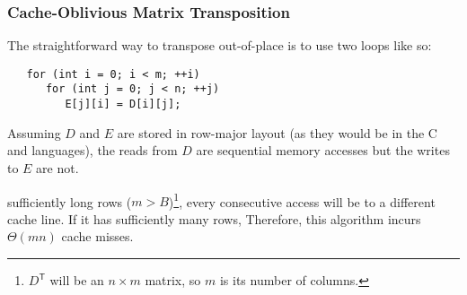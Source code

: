 \subsubsection{Cache-Oblivious Matrix Transposition}

The straightforward way to transpose 
out-of-place is to use two loops like so:
\begin{verbatim}
   for (int i = 0; i < m; ++i)
      for (int j = 0; j < n; ++j)
         E[j][i] = D[i][j];
\end{verbatim}
Assuming \(D\) and \(E\) are stored in row-major layout (as they would be in the C and
\cpp{} languages), the reads from \(D\) are sequential memory accesses but the writes to
\(E\) are not.

 sufficiently long rows (\(m > B\))\footnote{%
   \(D^\mathsf{T}\) will be an \(n\times m\) matrix, so \(m\) is its number of columns.
},
every consecutive access will be to a different cache line.  If it has sufficiently many
rows,
Therefore, this algorithm incurs \(\Theta(mn)\) cache misses.

